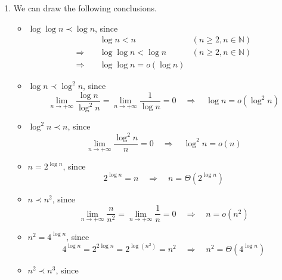 \documentclass[12pt,a4paper]{article}
\makeatletter
\newtheorem*{solution}{Solution}
\theoremstyle{definition}
\renewenvironment{solution}[1][Solution] {\par\pushQED{\qed}\normalfont\topsep6\p@\@plus6\p@\relax\trivlist\item[\hskip\labelsep\bfseries#1\@addpunct{.}]\ignorespaces}{\popQED\endtrivlist\@endpefalse} \makeatother
\makeatother
\begin{document}
\begin{enumerate}
    \begin{solution}
        We can draw the following conclusions.
        \begin{itemize}
        \item $\log{\log{n}} \prec \log{n}$, since
            \begin{displaymath}
            \begin{aligned}
            & \quad \log{n} < n \quad & (n \geq 2, n \in \mathbb{N})\\
            \Longrightarrow & \quad \log{\log{n}} < \log{n} \quad & (n \geq 2, n \in \mathbb{N})\\
            \Longrightarrow & \quad \log{\log{n}} = o(\log{n})
            \end{aligned}
            \end{displaymath}
        \item $\log{n} \prec \log^2{n}$, since
            \begin{displaymath}
            \lim_{n \rightarrow +\infty} \frac{\log{n}}{\log^2{n}} = \lim_{n \rightarrow +\infty} \frac{1}{\log{n}} = 0 \quad \Longrightarrow \quad \log{n} = o(\log^2{n})
            \end{displaymath}
        \item $\log^2{n} \prec n$, since
            \begin{displaymath}
            \lim_{n \rightarrow +\infty} \frac{\log^2{n}}{n} = 0 \quad \Longrightarrow \quad \log^2{n} = o(n)
            \end{displaymath}
        \item $n = 2^{\log{n}}$, since
            \begin{displaymath}
            2^{\log{n}} = n \quad \Longrightarrow \quad n = \Theta(2^{\log{n}})
            \end{displaymath}
        \item $n \prec n^2$, since
            \begin{displaymath}
            \lim_{n \rightarrow +\infty} \frac{n}{n^2} = \lim_{n \rightarrow +\infty} \frac{1}{n} = 0 \quad \Longrightarrow \quad n = o(n^2)
            \end{displaymath}
        \item $n^2 = 4^{\log{n}}$, since
            \begin{displaymath}
            4^{\log{n}} = 2^{2\log{n}} = 2^{\log(n^2)}=n^2 \quad \Longrightarrow \quad n^2 = \Theta(4^{\log{n}})
            \end{displaymath}
        \item $n^2 \prec n^3$, since

\end{itemize}
\end{solution}
\end{enumerate}
\end{document}
